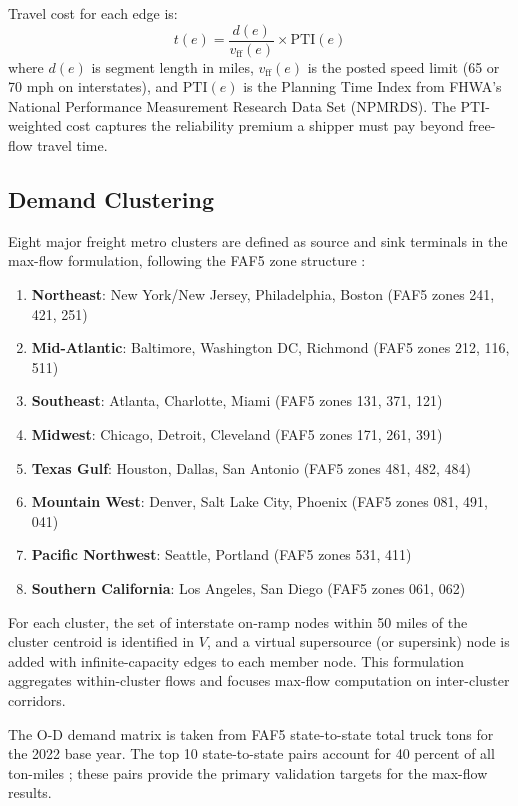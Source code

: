 Travel cost for each edge is:
\begin{equation}
  t(e) = \frac{d(e)}{v_\text{ff}(e)} \times \text{PTI}(e)
\end{equation}
where $d(e)$ is segment length in miles, $v_\text{ff}(e)$ is the posted speed limit (65 or 70 mph on interstates), and $\text{PTI}(e)$ is the Planning Time Index from FHWA's National Performance Measurement Research Data Set (NPMRDS). The PTI-weighted cost captures the reliability premium a shipper must pay beyond free-flow travel time.

\subsection{Demand Clustering}

Eight major freight metro clusters are defined as source and sink terminals in the max-flow formulation, following the FAF5 zone structure \citep{FAF5_2023}:

\begin{enumerate}
  \item \textbf{Northeast}: New York/New Jersey, Philadelphia, Boston (FAF5 zones 241, 421, 251)
  \item \textbf{Mid-Atlantic}: Baltimore, Washington DC, Richmond (FAF5 zones 212, 116, 511)
  \item \textbf{Southeast}: Atlanta, Charlotte, Miami (FAF5 zones 131, 371, 121)
  \item \textbf{Midwest}: Chicago, Detroit, Cleveland (FAF5 zones 171, 261, 391)
  \item \textbf{Texas Gulf}: Houston, Dallas, San Antonio (FAF5 zones 481, 482, 484)
  \item \textbf{Mountain West}: Denver, Salt Lake City, Phoenix (FAF5 zones 081, 491, 041)
  \item \textbf{Pacific Northwest}: Seattle, Portland (FAF5 zones 531, 411)
  \item \textbf{Southern California}: Los Angeles, San Diego (FAF5 zones 061, 062)
\end{enumerate}

For each cluster, the set of interstate on-ramp nodes within 50 miles of the cluster centroid is identified in $V$, and a virtual supersource (or supersink) node is added with infinite-capacity edges to each member node. This formulation aggregates within-cluster flows and focuses max-flow computation on inter-cluster corridors.

The O-D demand matrix is taken from FAF5 state-to-state total truck tons for the 2022 base year. The top 10 state-to-state pairs account for 40 percent of all ton-miles \citep{FAF5_2023}; these pairs provide the primary validation targets for the max-flow results.

